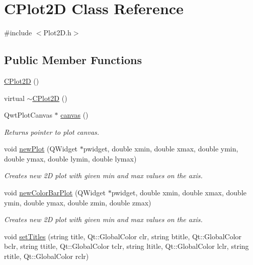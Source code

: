 \hypertarget{class_c_plot2_d}{\section{C\-Plot2\-D Class Reference}
\label{class_c_plot2_d}
}


{\ttfamily \#include $<$Plot2\-D.\-h$>$}

\subsection*{Public Member Functions}
\begin{DoxyCompactItemize}
\item 
\hyperlink{class_c_plot2_d_a246d313948262010a6b4c0ae35dcd018}{C\-Plot2\-D} ()
\item 
virtual \hyperlink{class_c_plot2_d_ab6a336373e5d6c8921203d02f6c9b001}{$\sim$\-C\-Plot2\-D} ()
\item 
Qwt\-Plot\-Canvas $\ast$ \hyperlink{class_c_plot2_d_adaf4b046b335ef408b926aafa6904e94}{canvas} ()
\begin{DoxyCompactList}\small\item\em Returns pointer to plot canvas. \end{DoxyCompactList}\item 
void \hyperlink{class_c_plot2_d_ac75b52dfcaf4b747eb9c4a00b9e4a8d6}{new\-Plot} (Q\-Widget $\ast$pwidget, double xmin, double xmax, double ymin, double ymax, double lymin, double lymax)
\begin{DoxyCompactList}\small\item\em Creates new 2\-D plot with given min and max values on the axis. \end{DoxyCompactList}\item 
void \hyperlink{class_c_plot2_d_ab684969d5d7c18cde8912a839c3c4ea1}{new\-Color\-Bar\-Plot} (Q\-Widget $\ast$pwidget, double xmin, double xmax, double ymin, double ymax, double zmin, double zmax)
\begin{DoxyCompactList}\small\item\em Creates new 2\-D plot with given min and max values on the axis. \end{DoxyCompactList}\item 
void \hyperlink{class_c_plot2_d_af6a12102bfbb2de27dbbf978ee4f73cc}{set\-Titles} (string title, Qt\-::\-Global\-Color clr, string btitle, Qt\-::\-Global\-Color bclr, string ttitle, Qt\-::\-Global\-Color tclr, string ltitle, Qt\-::\-Global\-Color lclr, string rtitle, Qt\-::\-Global\-Color rclr)
\item 

\end{DoxyCompactItemize}
